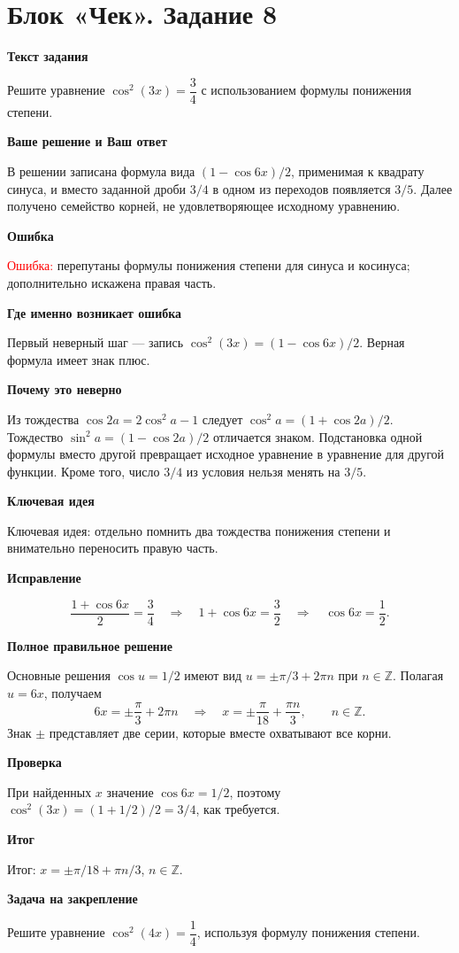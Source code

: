 \documentclass[11pt,a4paper]{article}
\newcommand{\Part}[1]{\par\medskip\noindent\textbf{#1}\par\smallskip}
\newcommand{\Task}[2]{\clearpage\phantomsection\label{task:#1}\section*{#2}}
\newcommand{\Err}[1]{\textcolor{red}{Ошибка:} #1}
\newcommand{\Idea}[1]{\textcolor{blue!60!black}{Ключевая идея:} #1}
\newcommand{\Result}[1]{\textcolor{teal!60!black}{Итог:} #1}
\begin{document}
\Task{c8}{Блок «Чек». Задание 8}
\Part{Текст задания}
Решите уравнение $\cos^2(3x)=\dfrac34$ с использованием формулы понижения степени.
\Part{Ваше решение и Ваш ответ}
В решении записана формула вида $(1-\cos6x)/2$, применимая к квадрату синуса, и вместо заданной дроби $3/4$ в одном из переходов появляется $3/5$. Далее получено семейство корней, не удовлетворяющее исходному уравнению.
\Part{Ошибка}
\Err{перепутаны формулы понижения степени для синуса и косинуса; дополнительно искажена правая часть.}
\Part{Где именно возникает ошибка}
Первый неверный шаг --- запись $\cos^2(3x)=(1-\cos6x)/2$. Верная формула имеет знак плюс.
\Part{Почему это неверно}
Из тождества $\cos2a=2\cos^2a-1$ следует $\cos^2a=(1+\cos2a)/2$. Тождество $\sin^2a=(1-\cos2a)/2$ отличается знаком. Подстановка одной формулы вместо другой превращает исходное уравнение в уравнение для другой функции. Кроме того, число $3/4$ из условия нельзя менять на $3/5$.
\Part{Ключевая идея}
\Idea{отдельно помнить два тождества понижения степени и внимательно переносить правую часть.}
\Part{Исправление}
\[\frac{1+\cos6x}{2}=\frac34\quad\Longrightarrow\quad1+\cos6x=\frac32\quad\Longrightarrow\quad\cos6x=\frac12.\]
\Part{Полное правильное решение}
Основные решения $\cos u=1/2$ имеют вид $u=\pm\pi/3+2\pi n$ при $n\in\mathbb Z$. Полагая $u=6x$, получаем
\[6x=\pm\frac\pi3+2\pi n\quad\Longrightarrow\quad x=\pm\frac\pi{18}+\frac{\pi n}{3},\qquad n\in\mathbb Z.\]
Знак $\pm$ представляет две серии, которые вместе охватывают все корни.
\Part{Проверка}
При найденных $x$ значение $\cos6x=1/2$, поэтому $\cos^2(3x)=(1+1/2)/2=3/4$, как требуется.
\Part{Итог}
\Result{$x=\pm\pi/18+\pi n/3$, $n\in\mathbb Z$.}
\Part{Задача на закрепление}
Решите уравнение $\cos^2(4x)=\dfrac14$, используя формулу понижения степени.
\end{document}
